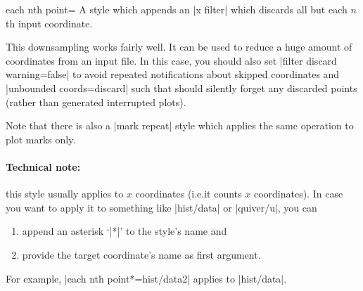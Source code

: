 \begin{pgfplotskey}{each nth point=}
    A style which appends an |x filter| which discards all but each $n$th input
    coordinate.

    This downsampling works fairly well. It can be used to reduce a huge amount
    of coordinates from an input file. In this case, you should also set
    |filter discard warning=false| to avoid repeated notifications about
    skipped coordinates and |unbounded coords=discard| such that \PGFPlots{}
    should silently forget any discarded points (rather than generated
    interrupted plots).

    Note that there is also a |mark repeat| style which applies the same
    operation to plot marks only.


    \paragraph{Technical note:}

    this style usually applies to $x$ coordinates (i.e.\@ it counts $x$
    coordinates). In case you want to apply it to something like |hist/data| or
    |quiver/u|, you can
    \begin{enumerate}
        \item append an asterisk `|*|' to the style's name and
        \item provide the target coordinate's name as first argument.
    \end{enumerate}
    For example, |each nth point*={hist/data}{2}| applies to |hist/data|.
\end{pgfplotskey}

